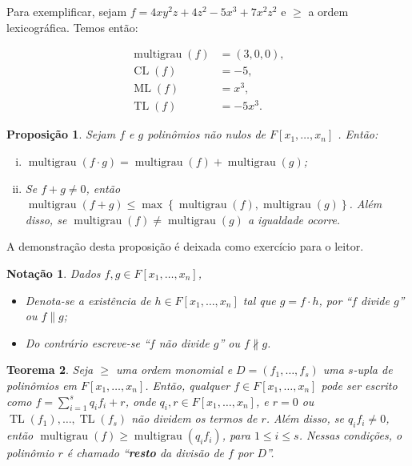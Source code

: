 \documentclass[12pt,a4paper]{report}
\newcommand{\divides}{\parallel}
\newcommand{\ndivides}{\nparallel}
\newtheorem{theorem}{Teorema}
\newtheorem{proposition}[theorem]{Proposição}
\newtheorem*{notation}{Notação}
\numberwithin{theorem}{chapter}
\DeclareMathOperator{\multigrau}{multigrau}
\DeclareMathOperator{\CL}{CL}
\DeclareMathOperator{\ML}{ML}
\DeclareMathOperator{\TL}{TL}
\begin{document}
Para exemplificar, sejam \(f = 4xy^2z+4z^2-5x^3+7x^2z^2\) e \(\geq\) a
ordem lexicográfica.  Temos então:

\begin{align*}
  \multigrau(f) &= (3,0,0),\\
  \CL(f) &= -5,\\
  \ML(f) &= x^3,\\
  \TL(f) &= -5x^3.
\end{align*}

\begin{proposition}\label{prop_multigrau}
  Sejam \(f\) e \(g\) polinômios não nulos de \(F[x_1,\ldots,x_n]\) .
  Então:
  \begin{enumerate}[(i)]
  \item \(\multigrau(f \cdot g) = \multigrau(f) + \multigrau(g)\);
  \item Se \(f + g \neq 0\), então \(\multigrau(f + g) \leq
    \max\left\{\multigrau(f),\multigrau(g)\right\}\).  Além disso,
    se \(\multigrau(f) \neq \multigrau(g)\) a igualdade ocorre.
  \end{enumerate}
\end{proposition}

A demonstração desta proposição é deixada como exercício para o
leitor.

\begin{notation} Dados \(f, g \in F[x_1,\ldots,x_n]\),
  \begin{itemize}
  \item Denota-se a existência de \(h \in F[x_1,\ldots,x_n]\) tal que
    \(g = f \cdot h\), por ``\(f\) divide \(g\)'' ou \(f \divides g\);
  \item Do contrário escreve-se ``\(f\) não divide \(g\)'' ou
    \(f \ndivides g\).
  \end{itemize}
\end{notation}

\begin{theorem}\label{teo_div_algo}
  Seja \(\geq\) uma ordem monomial e \(D = (f_1,\ldots,f_s)\) uma
  \(s\)-upla de polinômios em \(F[x_1,\ldots,x_n]\).  Então, qualquer
  \(f \in F[x_1,\ldots,x_n]\) pode ser escrito como \(f =
  \sum\limits_{i=1}^{s}{q_if_i}+r\), onde \(q_i,r \in
  F[x_1,\ldots,x_n]\), e \(r = 0\) ou \(\TL(f_1),\ldots,\TL(f_s)\) não
  dividem os termos de \(r\).  Além disso, se \(q_if_i \neq 0\), então
  \(\multigrau(f) \geq \multigrau (q_if_i)\), para \(1 \leq i \leq
  s\).  Nessas condições, o polinômio \(r\) é chamado ``\textbf{resto}
  da divisão de \(f\) por \(D\)''.
\end{theorem}
\end{document}
